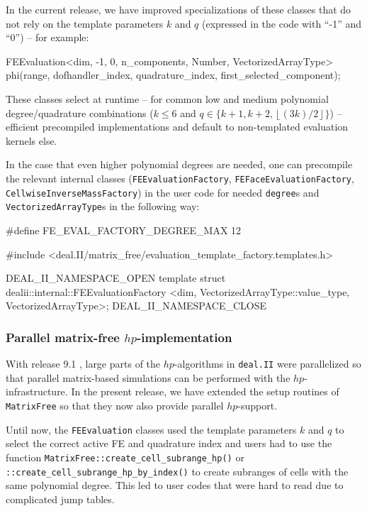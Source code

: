 \documentclass{ansarticle-preprint}
\newcommand{\specialword}[1]{\texttt{#1}}
\newcommand{\dealii}{{\specialword{deal.II}}\xspace}
\begin{document}
In the current release, we have improved specializations of these classes that do
not rely on the template parameters $k$ and $q$ (expressed in the code
with ``-1'' and ``0'') -- for example:
\begin{c++}
FEEvaluation<dim, -1, 0, n_components, Number, VectorizedArrayType>
  phi(range, dofhandler_index, quadrature_index, first_selected_component);
\end{c++}
These classes select at runtime -- for common low and medium
polynomial degree/quadrature combinations ($k\le 6$ and $q\in\{ k+1,
k+2, \left\lfloor (3k)/2 \right\rfloor \}$) -- efficient precompiled implementations and default to non-templated
evaluation kernels else.

In the case that even higher polynomial degrees are needed, one can precompile the
relevant internal classes
(\texttt{FEEvaluationFactory}, \texttt{FEFaceEvaluationFactory}, \texttt{CellwiseInverseMassFactory}) in the user code for needed \texttt{degree}s
and \texttt{VectorizedArrayType}s in the following way:
\begin{c++}
#define FE_EVAL_FACTORY_DEGREE_MAX 12

#include <deal.II/matrix_free/evaluation_template_factory.templates.h>

DEAL_II_NAMESPACE_OPEN
template struct dealii::internal::FEEvaluationFactory
  <dim, VectorizedArrayType::value_type, VectorizedArrayType>;
DEAL_II_NAMESPACE_CLOSE
\end{c++}


\subsubsection{Parallel matrix-free $hp$-implementation}\label{subsubsection:mf:hp}

With release 9.1 \cite{dealII91}, large parts of the $hp$-algorithms in \dealii were parallelized so that
parallel matrix-based simulations can be performed with the $hp$-infrastructure. In the present
release, we have extended the setup routines of \texttt{MatrixFree} so that they now also
provide parallel $hp$-support.

Until now, the \texttt{FEEvaluation} classes used the template parameters $k$ and $q$ to select the correct active FE and quadrature index and users had
to use the function \texttt{MatrixFree::create\_cell\_\allowbreak subrange\_\allowbreak hp()} or
\texttt{::create\_cell\_\allowbreak subrange\_\allowbreak hp\_\allowbreak by\_index()} to create subranges of cells with
the same polynomial degree. This led to user codes that were hard to read due to complicated jump tables.
\end{document}
